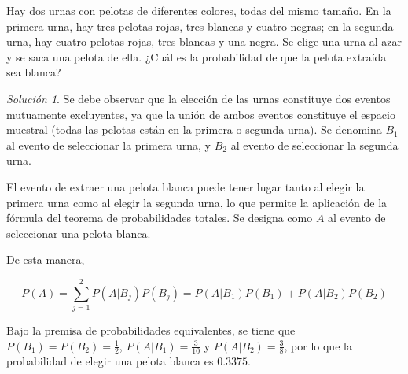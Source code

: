 \documentclass[
  us-letterpaper,
]{scrreprt}
\theoremstyle{plain}
\theoremstyle{definition}
\theoremstyle{definition}
\theoremstyle{plain}
\theoremstyle{remark}
\newtheorem*{solution}{Solución}
\begin{document}
\begin{tcolorbox}[enhanced jigsaw, breakable, colbacktitle=quarto-callout-caution-color!10!white, rightrule=.15mm, toptitle=1mm, colback=white, left=2mm, colframe=quarto-callout-caution-color-frame, bottomtitle=1mm, opacitybacktitle=0.6, leftrule=.75mm, arc=.35mm, title={Ejemplo (\textbf{\emph{Seleccionar una pelota de varias urnas}})}, coltitle=black, titlerule=0mm, opacityback=0, bottomrule=.15mm, toprule=.15mm]

Hay dos urnas con pelotas de diferentes colores, todas del mismo tamaño.
En la primera urna, hay tres pelotas rojas, tres blancas y cuatro
negras; en la segunda urna, hay cuatro pelotas rojas, tres blancas y una
negra. Se elige una urna al azar y se saca una pelota de ella. ¿Cuál es
la probabilidad de que la pelota extraída sea blanca?

\begin{solution}
Se debe observar que la elección de las urnas constituye dos eventos
mutuamente excluyentes, ya que la unión de ambos eventos constituye el
espacio muestral (todas las pelotas están en la primera o segunda urna).
Se denomina \(B_1\) al evento de seleccionar la primera urna, y \(B_2\)
al evento de seleccionar la segunda urna.

El evento de extraer una pelota blanca puede tener lugar tanto al elegir
la primera urna como al elegir la segunda urna, lo que permite la
aplicación de la fórmula del teorema de probabilidades totales. Se
designa como \(A\) al evento de seleccionar una pelota blanca.

De esta manera,

\[ P(A)= \sum_{j=1}^2 P(A|B_j)P(B_j)=P(A|B_1)P(B_1)+P(A|B_2)P(B_2) \]

Bajo la premisa de probabilidades equivalentes, se tiene que
\(P(B_1)=P(B_2)=\frac{1}{2}\), \(P(A|B_1)=\frac{3}{10}\) y
\(P(A|B_2)=\frac{3}{8}\), por lo que la probabilidad de elegir una
pelota blanca es \(0.3375\).
\end{solution}

\end{tcolorbox}
\end{document}

